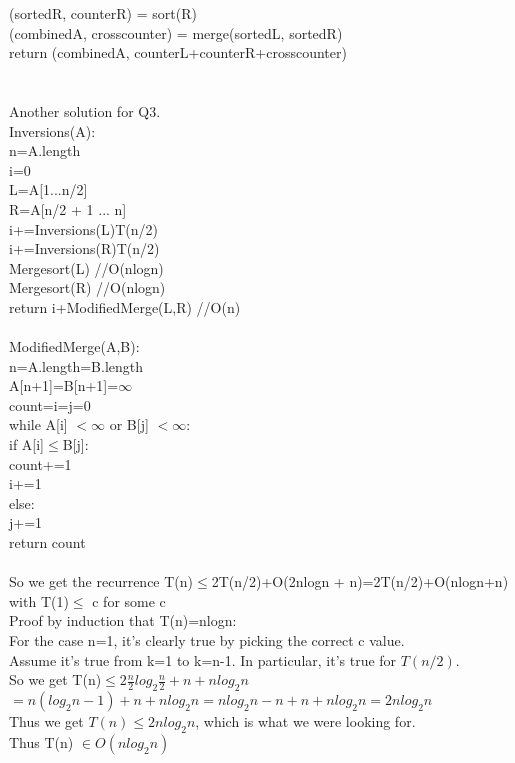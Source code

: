 \documentclass[10pt,a4paper]{article}
\newcommand\tab[1][1cm]{\hspace*{#1}}
\begin{document}
(sortedR, counterR) = sort(R) \\
(combinedA, crosscounter) = merge(sortedL, sortedR) \\
return (combinedA, counterL+counterR+crosscounter)  \\
\\ 
\\
Another solution for Q3. \\
Inversions(A):\\
n=A.length\\
i=0\\
L=A[1...n/2]\\
R=A[n/2 + 1 ... n]\\
i+=Inversions(L)\tab T(n/2) \\
i+=Inversions(R)\tab T(n/2) \\
Mergesort(L) \tab //O(nlogn)\\
Mergesort(R) \tab //O(nlogn)\\
return i+ModifiedMerge(L,R) \tab //O(n) \\
\\
ModifiedMerge(A,B):\\
n=A.length=B.length\\
A[n+1]=B[n+1]=$\infty$\\
count=i=j=0\\
while A[i] $< \infty$ or B[j] $ < \infty$:\\
\tab	 if A[i]$\leq$B[j]:\\
\tab \tab	count+=1\\
\tab \tab	i+=1\\
\tab else:\\
\tab \tab 	j+=1\\
return count \\
\\
So we get the recurrence T(n)$\leq$2T(n/2)+O(2nlogn + n)=2T(n/2)+O(nlogn+n) with T(1)$\leq$ c for some c \\
Proof by induction that T(n)=nlogn:\\
For the case n=1, it's clearly true by picking the correct c value.\\
Assume it's true from k=1 to k=n-1. In particular, it's true for $T(n/2)$. \\
So we get T(n)$\leq 2 \frac{n}{2}log_{2}{\frac{n}{2}} + n+nlog_{2}n$ \\
$= n(log_{2}n -1)+n+nlog_{2}n = nlog_{2}n-n+n+nlog_{2}n=2nlog_{2}n$\\
Thus we get $T(n)\leq 2nlog_{2}n$, which is what we were looking for. \\Thus T(n) $\in  O ( nlog_{2}n )$\\
\end{document}
